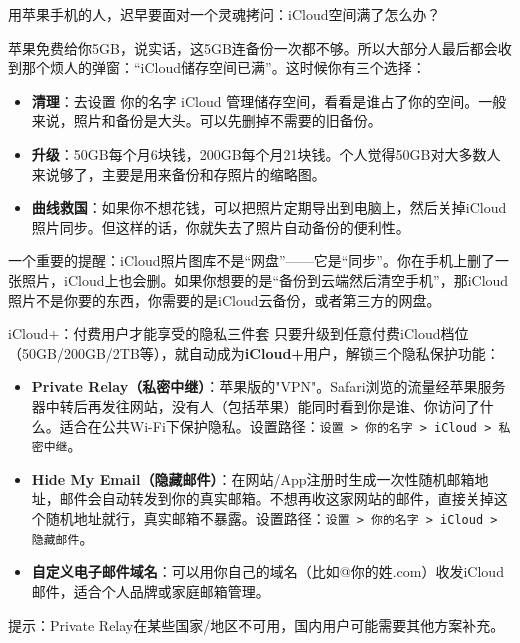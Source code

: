 用苹果手机的人，迟早要面对一个灵魂拷问：iCloud空间满了怎么办？

苹果免费给你5GB，说实话，这5GB连备份一次都不够。所以大部分人最后都会收到那个烦人的弹窗：“iCloud储存空间已满”。这时候你有三个选择：

\begin{itemize}
  \item \textbf{清理}：去设置 你的名字 iCloud 管理储存空间，看看是谁占了你的空间。一般来说，照片和备份是大头。可以先删掉不需要的旧备份。
  \item \textbf{升级}：50GB每个月6块钱，200GB每个月21块钱。个人觉得50GB对大多数人来说够了，主要是用来备份和存照片的缩略图。
  \item \textbf{曲线救国}：如果你不想花钱，可以把照片定期导出到电脑上，然后关掉iCloud照片同步。但这样的话，你就失去了照片自动备份的便利性。
\end{itemize}

一个重要的提醒：iCloud照片图库不是“网盘”——它是“同步”。你在手机上删了一张照片，iCloud上也会删。如果你想要的是“备份到云端然后清空手机”，那iCloud照片不是你要的东西，你需要的是iCloud云备份，或者第三方的网盘。

\begin{tcbinfo}{iCloud+：付费用户才能享受的隐私三件套}
只要升级到任意付费iCloud档位（50GB/200GB/2TB等），就自动成为\textbf{iCloud+}用户，解锁三个隐私保护功能：

\begin{itemize}
  \item \textbf{Private Relay（私密中继）}：苹果版的"VPN"。Safari浏览的流量经苹果服务器中转后再发往网站，没有人（包括苹果）能同时看到你是谁、你访问了什么。适合在公共Wi-Fi下保护隐私。设置路径：\texttt{设置 > 你的名字 > iCloud > 私密中继}。
  \item \textbf{Hide My Email（隐藏邮件）}：在网站/App注册时生成一次性随机邮箱地址，邮件会自动转发到你的真实邮箱。不想再收这家网站的邮件，直接关掉这个随机地址就行，真实邮箱不暴露。设置路径：\texttt{设置 > 你的名字 > iCloud > 隐藏邮件}。
  \item \textbf{自定义电子邮件域名}：可以用你自己的域名（比如@你的姓.com）收发iCloud邮件，适合个人品牌或家庭邮箱管理。
\end{itemize}

提示：Private Relay在某些国家/地区不可用，国内用户可能需要其他方案补充。

\end{tcbinfo}

